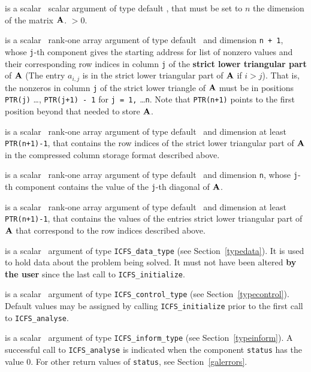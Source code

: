 \documentclass{galahad}
\newcommand{\packagename}{ICFS}
\begin{document}
\vspace*{-2mm}
\begin{description}
is a scalar \intentin\ scalar argument of type default \integer, that must be
set to $n$ the dimension of the matrix ${\mathbf{A}}$.
 $> 0$.

 is a scalar \intentin\ rank-one array argument of type
default \integer\ and dimension {\tt n + 1}, whose {\tt j}-th component
gives the starting address for list of nonzero values and their
corresponding row  indices in column {\tt j} of the
{\bf strict lower triangular part} of ${\mathbf{A}}$ (The entry $a_{i,j}$ is in
the strict lower triangular part of ${\mathbf{A}}$ if $i > j$).
That is, the nonzeros in column {\tt j} of the strict lower triangle of
${\mathbf{A}}$ must be in positions {\tt PTR(j)} \ldots, {\tt PTR(j+1) - 1} for
{\tt j = 1,} \ldots {\tt n}.
Note that {\tt PTR(n+1)} points to the first position beyond that needed
to store ${\mathbf{A}}$.

 is a scalar \intentin\ rank-one array argument of type
default \integer\ and dimension at least {\tt  PTR(n+1)-1},
that contains the row indices of the strict lower triangular part of ${\mathbf{A}}$
in the compressed column storage format described above.

 is a scalar \intentin\ rank-one array argument of type
default \realdp\ and dimension {\tt n}, whose {\tt j}-th component
contains the value of the {\tt j}-th diagonal of ${\mathbf{A}}$.

 is a scalar \intentin\ rank-one array argument of type
default \realdp\ and dimension at least {\tt  PTR(n+1)-1},
that contains the values of the entries strict lower triangular part of ${\mathbf{A}}$
that correspond to the row indices described above.

 is a scalar \intentinout\ argument of type
{\tt \packagename\_data\_type}
(see Section~\ref{typedata}). It is used to hold data about the problem being
solved. It must not have been altered {\bf by the user} since the last call to
{\tt \packagename\_initialize}.

 is a scalar \intentin\ argument of type
{\tt \packagename\_control\_type}
(see Section~\ref{typecontrol}). Default values may be assigned by calling
{\tt \packagename\_initialize} prior to the first call to
{\tt \packagename\_analyse}.

 is a scalar \intentinout\ argument of type
{\tt \packagename\_inform\_type}
(see Section~\ref{typeinform}).
A successful call to
{\tt \packagename\_analyse}
is indicated when the  component {\tt status} has the value 0.
For other return values of {\tt status}, see Section~\ref{galerrors}.

\end{description}
\end{document}

